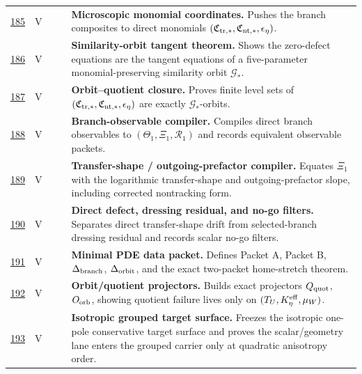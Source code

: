 {\begin{longtable}{@{}L{0.055\textwidth}L{0.075\textwidth}L{0.145\textwidth}L{0.235\textwidth}L{0.43\textwidth}@{}}
\addlinespace
\hyperref[stage:185]{185} & V &  & \StatusExactClosure{} & \textbf{Microscopic monomial coordinates.} Pushes the branch composites to direct monomials \((\mathfrak C_{{\rm tr},*},\mathfrak C_{{\rm nt},*},\epsilon_\eta)\). \\
\addlinespace
\hyperref[stage:186]{186} & V &  & \StatusExactClosure{} & \textbf{Similarity-orbit tangent theorem.} Shows the zero-defect equations are the tangent equations of a five-parameter monomial-preserving similarity orbit \(\mathcal G_*\). \\
\addlinespace
\hyperref[stage:187]{187} & V &  & \StatusExactClosure{} & \textbf{Orbit--quotient closure.} Proves finite level sets of \((\mathfrak C_{{\rm tr},*},\mathfrak C_{{\rm nt},*},\epsilon_\eta)\) are exactly \(\mathcal G_*\)-orbits. \\
\addlinespace
\hyperref[stage:188]{188} & V &  & \StatusExactClosure{} & \textbf{Branch-observable compiler.} Compiles direct branch observables to \((\Theta_1,\Xi_1,\mathcal R_1)\) and records equivalent observable packets. \\
\addlinespace
\hyperref[stage:189]{189} & V &  & \StatusExactClosure{} & \textbf{Transfer-shape / outgoing-prefactor compiler.} Equates \(\Xi_1\) with the logarithmic transfer-shape and outgoing-prefactor slope, including corrected nontracking form. \\
\addlinespace
\hyperref[stage:190]{190} & V &  & \StatusExactClosure{} & \textbf{Direct defect, dressing residual, and no-go filters.} Separates direct transfer-shape drift from selected-branch dressing residual and records scalar no-go filters. \\
\addlinespace
\hyperref[stage:191]{191} & V &  & \StatusExactClosure{} & \textbf{Minimal PDE data packet.} Defines Packet A, Packet B, \(\Delta_{\rm branch}\), \(\Delta_{\rm orbit}\), and the exact two-packet home-stretch theorem. \\
\addlinespace
\hyperref[stage:192]{192} & V &  & \StatusExactClosure{} & \textbf{Orbit/quotient projectors.} Builds exact projectors \(Q_{\rm quot}\), \(O_{\rm orb}\), showing quotient failure lives only on \((T_U,K_\eta^{\rm eff},\mu_W)\). \\
\addlinespace
\hyperref[stage:193]{193} & V &  & \StatusExactClosure{} & \textbf{Isotropic grouped target surface.} Freezes the isotropic one-pole conservative target surface and proves the scalar/geometry lane enters the grouped carrier only at quadratic anisotropy order. \\

\end{longtable}}
